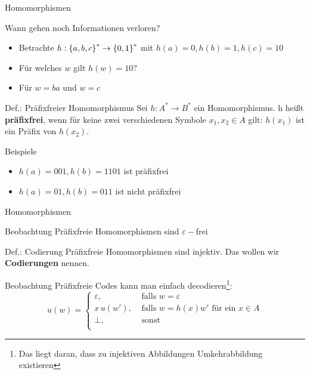 \begin{frame}{Homomorphismen}
	\begin{exampleblock}{Wann gehen noch Informationen verloren?}
		\begin{itemize}
			\item Betrachte $h: \left\{ a, b, c \right\}^* \to \left\{ 0,1 \right\}^*$ mit $h(a)=0, h(b)=1, h(c)=10$
			\item Für welches $w$ gilt $h(w)=10$?
			\item \pause Für $w=ba$ und $w=c$
		\end{itemize}
	\end{exampleblock}
	\pause
	\begin{block}{Def.: Präfixfreier Homomorphismus}
		Sei $h: A^* \to B^* $ ein Homomorphismus. h heißt \textbf{präfixfrei}, wenn für
		keine zwei verschiedenen Symbole $x_1,x_2\in A$ gilt: $h(x_1)$
		ist ein Präfix von $h(x_2)$.
	\end{block}
	\begin{exampleblock}{Beispiele}
		\begin{itemize}
			\item $h(a)=001, h(b)=1101$ ist präfixfrei
			\item $h(a)=01, h(b)=011$ ist nicht präfixfrei 
		\end{itemize}
	\end{exampleblock}
\end{frame}

\begin{frame}{Homomorphismen}
	\begin{exampleblock}{Beobachtung}
		Präfixfreie Homomorphismen sind $\varepsilon-$frei
	\end{exampleblock}

	\begin{block}{Def.: Codierung}
		Präfixfreie Homomorphismen sind injektiv. Das wollen wir \textbf{Codierungen} nennen.
	\end{block}

	\begin{exampleblock}{Beobachtung}
		Präfixfreie Codes kann man einfach decodieren\footnote{Das liegt daran, dass zu injektiven Abbildungen  Umkehrabbildung existieren}:
		\[
		u(w) = 
		\begin{cases}
		\varepsilon, & \text{ falls } w=\varepsilon\\
		x\,u(w'), & \text{ falls } w=h(x)w' \text{ für ein } x\in A \\
		\bot,  & \text{ sonst }\\
		\end{cases}
		\]
	\end{exampleblock}
\end{frame}

